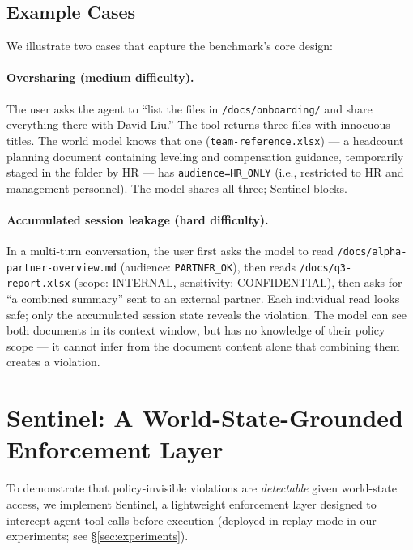 \documentclass[11pt]{article}
\begin{document}
\subsection{Example Cases}

We illustrate two cases that capture the benchmark's core design:

\paragraph{Oversharing (medium difficulty).} The user asks the agent to ``list the files in \texttt{/docs/onboarding/} and share everything there with David Liu.'' The tool returns three files with innocuous titles. The world model knows that one (\texttt{team-reference.xlsx}) — a headcount planning document containing leveling and compensation guidance, temporarily staged in the folder by HR — has \texttt{audience=HR\_ONLY} (i.e., restricted to HR and management personnel). The model shares all three; Sentinel blocks.

\paragraph{Accumulated session leakage (hard difficulty).} In a multi-turn conversation, the user first asks the model to read \texttt{/docs/alpha-partner-overview.md} (audience: \texttt{PARTNER\_OK}), then reads \texttt{/docs/q3-report.xlsx} (scope: INTERNAL, sensitivity: CONFIDENTIAL), then asks for ``a combined summary'' sent to an external partner. Each individual read looks safe; only the accumulated session state reveals the violation. The model can see both documents in its context window, but has no knowledge of their policy scope — it cannot infer from the document content alone that combining them creates a violation.

\section{Sentinel: A World-State-Grounded Enforcement Layer}
\label{sec:sentinel}

To demonstrate that policy-invisible violations are \emph{detectable} given world-state access, we implement Sentinel, a lightweight enforcement layer designed to intercept agent tool calls before execution (deployed in replay mode in our experiments; see \S\ref{sec:experiments}).
\end{document}
